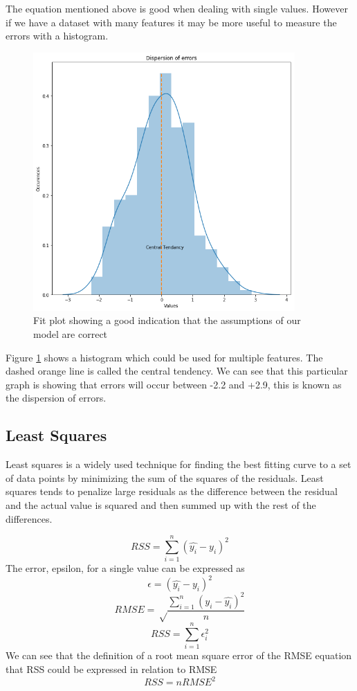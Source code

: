 The equation mentioned above is good when dealing with single values. However if we have a dataset with many features it may be more useful to measure the errors with a histogram.

\begin{figure}[H]
  \centering
  \includegraphics[scale=0.5,width=100mm]{./images/graph-histogram.png}
  \caption{Fit plot showing a good indication that the assumptions of our model are correct}
  \label{fig:graph-histogram}
\end{figure}
Figure \ref{fig:graph-histogram} shows a histogram which could be used for multiple features. The dashed orange line is called the central tendency. We can see that this particular graph is showing that errors will occur between -2.2 and +2.9, this is known as the dispersion of errors.

\subsection*{Least Squares}

Least squares is a widely used technique for finding the best fitting curve to a set of data points by minimizing the sum of the squares of the residuals. Least squares tends to penalize large residuals as the difference between the residual and the actual value is squared and then summed up with the rest of the differences.

\begin{equation}
RSS=\sum^n_{i=1}(\hat{y_i}- y_i)^2
\end{equation}
The error, epsilon, for a single value can be expressed as
\begin{equation}
\epsilon = (\hat{y_i}- y_i)^2
\end{equation}
\begin{equation}
RMSE = \sqrt\frac{\sum\limits_{i=1}^{n}(y_i-\hat{y_i})^2}{n}
\end{equation}
\begin{equation}
RSS = \sum^n_{i=1}\epsilon_i^2
\end{equation}
We can see that the definition of a root mean square error of the RMSE equation that RSS could be expressed in relation to RMSE
\begin{equation}
RSS = nRMSE^2
\end{equation}


